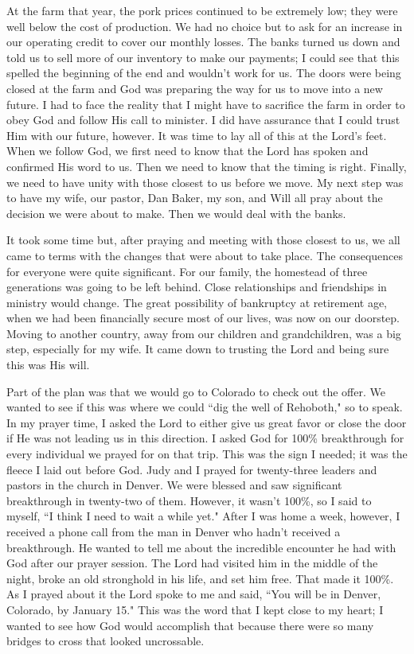 \documentclass[oneside,12pt]{book}
\begin{document}
At the farm that year, the pork prices continued to be extremely low; they were well below the cost of production. We had no choice but to ask for an increase in our operating credit to cover our monthly losses. The banks turned us down and told us to sell more of our inventory to make our payments; I could see that this spelled the beginning of the end and wouldn't work for us. The doors were being closed at the farm and God was preparing the way for us to move into a new future. I had to face the reality that I might have to sacrifice the farm in order to obey God and follow His call to minister. I did have assurance that I could trust Him with our future, however. It was time to lay all of this at the Lord's feet. When we follow God, we first need to know that the Lord has spoken and confirmed His word to us. Then we need to know that the timing is right. Finally, we need to have unity with those closest to us before we move.  My next step was to have my wife, our pastor, Dan Baker, my son, and Will all pray about the decision we were about to make. Then we would deal with the banks.

It took some time but, after praying and meeting with those closest to us, we all came to terms with the changes that were about to take place. The consequences for everyone were quite significant. For our family, the homestead of three generations was going to be left behind. Close relationships and friendships in ministry would change. The great possibility of bankruptcy at retirement age, when we had been financially secure most of our lives, was now on our doorstep. Moving to another country, away from our children and grandchildren, was a big step, especially for my wife. It came down to trusting the Lord and being sure this was His will.

Part of the plan was that we would go to Colorado to check out the offer. We wanted to see if this was where we could ``dig the well of Rehoboth," so to speak. In my prayer time, I asked the Lord to either give us great favor or close the door if He was not leading us in this direction. I asked God for 100\% breakthrough for every individual we prayed for on that trip. This was the sign I needed; it was the fleece I laid out before God. Judy and I prayed for twenty-three leaders and pastors in the church in Denver. We were blessed and saw significant breakthrough in twenty-two of them. However, it wasn't 100\%, so I said to myself, ``I think I need to wait a while yet." After I was home a week, however, I received a phone call from the man in Denver who hadn't received a breakthrough. He wanted to tell me about the incredible encounter he had with God after our prayer session. The Lord had visited him in the middle of the night, broke an old stronghold in his life, and set him free. That made it 100\%. As I prayed about it the Lord spoke to me and said, ``You will be in Denver, Colorado, by January 15." This was the word that I kept close to my heart; I wanted to see how God would accomplish that because there were so many bridges to cross that looked uncrossable.
\end{document}
